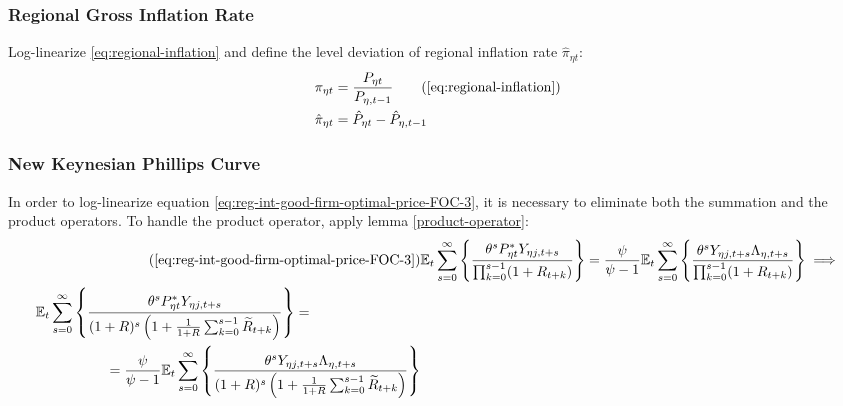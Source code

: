 \documentclass[../thesis.tex]{subfiles}
\begin{document}
		
	\subsubsection*{Regional Gross Inflation Rate}

	Log-linearize \ref{eq:regional-inflation} and define the level deviation of regional inflation rate $\hat{\pi}_{\eta t}$:
	\begin{align}
		\pi_{\eta t} &= \frac{P_{\eta t}}{P_{\eta, t-1}} \tag{\ref{eq:regional-inflation}} \\
		\hat{\pi}_{\eta t} &= \hat{P}_{\eta t} - \hat{P}_{\eta, t-1}
		\label{eq:level-dev-regional-inflation}
	\end{align}


\subsubsection*{New Keynesian Phillips Curve}

In order to log-linearize equation \ref{eq:reg-int-good-firm-optimal-price-FOC-3}, it is necessary to eliminate both the summation and the product operators. To handle the product operator, apply lemma \ref{product-operator}:
\begin{align}
	\tag{\ref{eq:reg-int-good-firm-optimal-price-FOC-3}}
	& \E \sum_{s=0}^{\infty} \left\{ \frac{\theta^s P_{\eta t}^{\ast} Y_{\eta j,t+s}}{ \prod_{k=0}^{s-1}(1+R_{t+k})} \right\} = \frac{\psi}{\psi-1} \E \sum_{s=0}^{\infty} \left\{ \frac{\theta^s Y_{\eta j,t+s} \Lambda_{\eta, t+s}}{\prod_{k=0}^{s-1}(1+R_{t+k})} \right\} \implies
	\\
	\begin{split}
		& \E \sum_{s=0}^{\infty} \left\{ \frac{\theta^s P_{\eta t}^{\ast} Y_{\eta j,t+s}}{ (1 + R)^s \left( 1 + \frac{1}{1 + R} \sum_{k=0}^{s-1} \widetilde{R}_{t+k} \right)} \right\} = 
		\\ & \quad \quad \quad \quad \quad = \frac{\psi}{\psi-1} \E \sum_{s=0}^{\infty} \left\{ \frac{\theta^s Y_{\eta j,t+s} \Lambda_{\eta, t+s}}{ (1 + R)^s \left( 1 + \frac{1}{1 + R} \sum_{k=0}^{s-1} \widetilde{R}_{t+k} \right)} \right\} \label{eq:reg-ll-optimal-price}
	\end{split}
\end{align}
\end{document}
